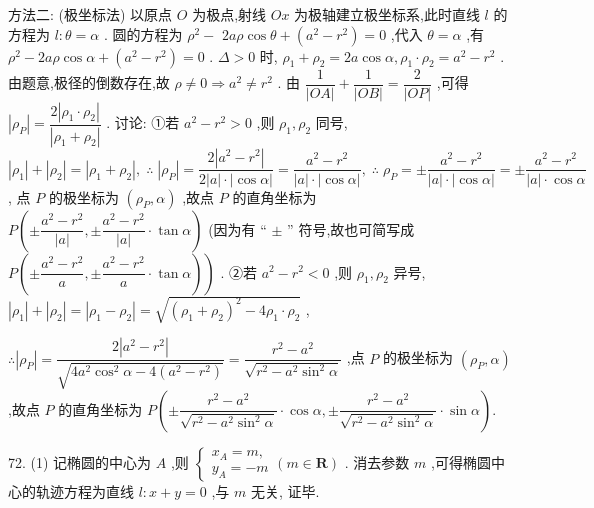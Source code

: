 方法二: (极坐标法) 以原点 $O$ 为极点,射线 ${Ox}$ 为极轴建立极坐标系,此时直线 $l$ 的方程为 $l : \theta  = \alpha$ . 圆的方程为 ${\rho }^{2} -$  ${2a\rho }\cos \theta  + \left( {{a}^{2} - {r}^{2}}\right)  = 0$ ,代入 $\theta  = \alpha$ ,有 ${\rho }^{2} - {2a\rho }\cos \alpha  + \left( {{a}^{2} - {r}^{2}}\right)  = 0$ . $\Delta  > 0$ 时, ${\rho }_{1} + {\rho }_{2} = {2a}\cos \alpha ,{\rho }_{1} \cdot  {\rho }_{2} = {a}^{2} - {r}^{2}$ . 由题意,极径的倒数存在,故 $\rho  \neq  0 \Rightarrow  {a}^{2} \neq  {r}^{2}$ . 由 $\dfrac{1}{\left| OA\right| } + \dfrac{1}{\left| OB\right| } = \dfrac{2}{\left| OP\right| }$ ,可得 $\left| {\rho }_{P}\right|  = \dfrac{2\left| {{\rho }_{1} \cdot  {\rho }_{2}}\right| }{\left| {\rho }_{1} + {\rho }_{2}\right| }$ . 讨论: ①若 ${a}^{2} - {r}^{2} > 0$ ,则 ${\rho }_{1},{\rho }_{2}$ 同号, $\left| {\rho }_{1}\right|  + \left| {\rho }_{2}\right|  = \left| {{\rho }_{1} + {\rho }_{2}}\right| ,\;\therefore \;\left| {\rho }_{P}\right|  = \dfrac{2\left| {{a}^{2} - {r}^{2}}\right| }{2\left| a\right|  \cdot  \left| {\cos \alpha }\right| } = \dfrac{{a}^{2} - {r}^{2}}{\left| a\right|  \cdot  \left| {\cos \alpha }\right| },\;\therefore \;{\rho }_{P} =  \pm  \dfrac{{a}^{2} - {r}^{2}}{\left| a\right|  \cdot  \left| {\cos \alpha }\right| } =  \pm  \dfrac{{a}^{2} - {r}^{2}}{\left| a\right|  \cdot  \cos \alpha }$ , 点 $P$ 的极坐标为 $\left( {{\rho }_{P},\alpha }\right)$ ,故点 $P$ 的直角坐标为 $P\left( {\pm \dfrac{{a}^{2} - {r}^{2}}{\left| a\right| }, \pm  \dfrac{{a}^{2} - {r}^{2}}{\left| a\right| } \cdot  \tan \alpha }\right)$ (因为有 “ $\pm$ ” 符号,故也可简写成 $\left. {P\left( {\pm \dfrac{{a}^{2} - {r}^{2}}{a}, \pm  \dfrac{{a}^{2} - {r}^{2}}{a} \cdot  \tan \alpha }\right) }\right)$ . ②若 ${a}^{2} - {r}^{2} < 0$ ,则 ${\rho }_{1},{\rho }_{2}$ 异号, $\left| {\rho }_{1}\right|  + \left| {\rho }_{2}\right|  = \left| {{\rho }_{1} - {\rho }_{2}}\right|  = \sqrt{{\left( {\rho }_{1} + {\rho }_{2}\right) }^{2} - 4{\rho }_{1} \cdot  {\rho }_{2}}$ ,

$\therefore \left| {\rho }_{P}\right|  = \dfrac{2\left| {{a}^{2} - {r}^{2}}\right| }{\sqrt{4{a}^{2}{\cos }^{2}\alpha  - 4\left( {{a}^{2} - {r}^{2}}\right) }} = \dfrac{{r}^{2} - {a}^{2}}{\sqrt{{r}^{2} - {a}^{2}{\sin }^{2}\alpha }}$ ,点 $P$ 的极坐标为 $\left( {{\rho }_{P},\alpha }\right)$ ,故点 $P$ 的直角坐标为 $P\left( {\pm \dfrac{{r}^{2} - {a}^{2}}{\sqrt{{r}^{2} - {a}^{2}{\sin }^{2}\alpha }} \cdot  \cos \alpha , \pm  \dfrac{{r}^{2} - {a}^{2}}{\sqrt{{r}^{2} - {a}^{2}{\sin }^{2}\alpha }} \cdot  \sin \alpha }\right) .$

72. (1) 记椭圆的中心为 $A$ ,则 $\left\{  {\begin{array}{l} {x}_{A} = m, \\  {y}_{A} =  - m \end{array}\left( {m \in  \mathbf{R}}\right) }\right.$ . 消去参数 $m$ ,可得椭圆中心的轨迹方程为直线 $l : x + y = 0$ ,与 $m$ 无关, 证毕.


